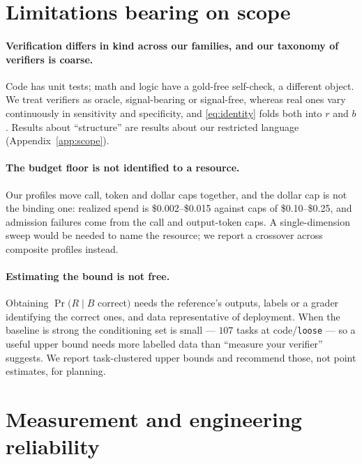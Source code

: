 \documentclass{article}
\newcommand{\rrate}{r}
\newcommand{\brate}{b}
\begin{document}
\section{Limitations bearing on scope}
\label{app:scopelim}

\paragraph{Verification differs in kind across our families, and our taxonomy of
verifiers is coarse.} Code has unit tests; math and logic have a gold-free
self-check, a different object. We treat verifiers as oracle, signal-bearing or
signal-free, whereas real ones vary continuously in sensitivity and specificity,
and \eqref{eq:identity} folds both into $\rrate$ and $\brate$. Results about
``structure'' are results about our restricted language
(Appendix~\ref{app:scope}).

\paragraph{The budget floor is not identified to a resource.} Our profiles move
call, token and dollar caps together, and the dollar cap is not the binding one:
realized spend is \$0.002--\$0.015 against caps of \$0.10--\$0.25, and admission
failures come from the call and output-token caps. A single-dimension sweep
would be needed to name the resource; we report a crossover across composite
profiles instead.

\paragraph{Estimating the bound is not free.} Obtaining $\Pr(R \mid B$ correct$)$
needs the reference's outputs, labels or a grader identifying the correct ones,
and data representative of deployment. When the baseline is strong the
conditioning set is small --- $107$ tasks at code/\texttt{loose} --- so a useful
upper bound needs more labelled data than ``measure your verifier'' suggests.
We report task-clustered upper bounds and recommend those, not point estimates,
for planning.

\section{Measurement and engineering reliability}
\label{app:reliability}
\end{document}
